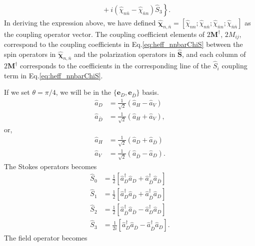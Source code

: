\documentclass[preprint,aps,pra,onecolumn,superscriptaddress]{revtex4-1} %
\begin{document}
\begin{appendix}
\begin{align}
&\quad+\left. i \left(\hat{\chi}_{n\bar{n}}-\hat{\chi}_{\bar{n}n}\right)\hat{S}_3 \right\}.\label{eq:heff_nnbarChiS}
\end{align}
In deriving the expression above, we have defined $\hat{\boldsymbol{\chi}}_{n,\bar{n}}=[\hat{\chi}_{nn};\hat{\chi}_{n\bar{n}};\hat{\chi}_{\bar{n}n};\hat{\chi}_{\bar{n}\bar{n}}]$ as the coupling operator vector.
The coupling coefficient elements of $ 2\mathbf{M}^\dagger $, $ 2M_{ij} $, correspond to the coupling coefficients in Eq.\eqref{eq:heff_nnbarChiS} between the spin operators in $ \hat{\boldsymbol{\chi}}_{n,\bar{n}} $ and the polarization operators in $ \hat{\mathbf{S}} $, and each column of $ 2\mathbf{M}^\dagger $ corresponds to the coefficients in the corresponding line of the $ \hat{S}_i $ coupling term in Eq.\eqref{eq:heff_nnbarChiS}.


If we set $ \theta=\pi/4 $, we will be in the $ \{\mathbf{e}_D,\mathbf{e}_{\bar{D}} \} $ basis.
\begin{subequations}
\begin{align}
\hat{a}_D &= \frac{1}{\sqrt{2}}(\hat{a}_H-\hat{a}_V)\\
\hat{a}_{\bar{D}} &= \frac{1}{\sqrt{2}}(\hat{a}_H+\hat{a}_V),
\end{align}
\end{subequations}
or,
\begin{subequations}
\begin{align}
\hat{a}_H &= \frac{1}{\sqrt{2}}(\hat{a}_D+\hat{a}_{\bar{D}})\\
\hat{a}_V &= \frac{1}{\sqrt{2}}(\hat{a}_{\bar{D}}-\hat{a}_D).
\end{align}
\end{subequations}
The Stokes operators becomes
\begin{subequations}
\begin{align}
\hat{S}_0 &= \frac{1}{2} \left[\hat{a}_D^\dagger\hat{a}_D+\hat{a}_{\bar{D}}^\dagger\hat{a}_{\bar{D}} \right]\\
\hat{S}_1 &= \frac{1}{2} \left[ \hat{a}_D^\dagger\hat{a}_{\bar{D}} +  \hat{a}_{\bar{D}}^\dagger\hat{a}_D \right]\\
\hat{S}_2 &= \frac{1}{2} \left[ \hat{a}_{\bar{D}}^\dagger\hat{a}_{\bar{D}}-\hat{a}_D^\dagger\hat{a}_D \right]\\
\hat{S}_3 &= \frac{1}{2i} \left[\hat{a}_D^\dagger\hat{a}_{\bar{D}}-\hat{a}_{\bar{D}}^\dagger\hat{a}_D \right].
\end{align}
\end{subequations}
The field operator becomes 
\begin{align}

\end{align}
\end{appendix}
\end{document}
